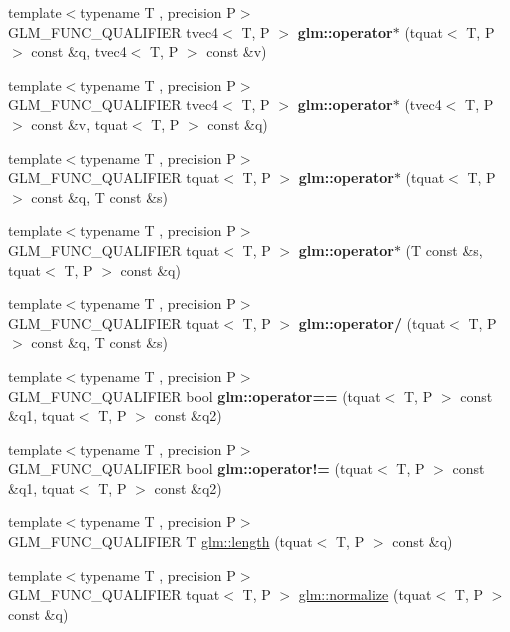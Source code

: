 \begin{DoxyCompactItemize}
\item 
{\footnotesize template$<$typename T , precision P$>$ }\\G\+L\+M\+\_\+\+F\+U\+N\+C\+\_\+\+Q\+U\+A\+L\+I\+F\+I\+ER tvec4$<$ T, P $>$ {\bfseries glm\+::operator$\ast$} (tquat$<$ T, P $>$ const \&q, tvec4$<$ T, P $>$ const \&v)
\item 
{\footnotesize template$<$typename T , precision P$>$ }\\G\+L\+M\+\_\+\+F\+U\+N\+C\+\_\+\+Q\+U\+A\+L\+I\+F\+I\+ER tvec4$<$ T, P $>$ {\bfseries glm\+::operator$\ast$} (tvec4$<$ T, P $>$ const \&v, tquat$<$ T, P $>$ const \&q)
\item 
{\footnotesize template$<$typename T , precision P$>$ }\\G\+L\+M\+\_\+\+F\+U\+N\+C\+\_\+\+Q\+U\+A\+L\+I\+F\+I\+ER tquat$<$ T, P $>$ {\bfseries glm\+::operator$\ast$} (tquat$<$ T, P $>$ const \&q, T const \&s)
\item 
{\footnotesize template$<$typename T , precision P$>$ }\\G\+L\+M\+\_\+\+F\+U\+N\+C\+\_\+\+Q\+U\+A\+L\+I\+F\+I\+ER tquat$<$ T, P $>$ {\bfseries glm\+::operator$\ast$} (T const \&s, tquat$<$ T, P $>$ const \&q)
\item 
{\footnotesize template$<$typename T , precision P$>$ }\\G\+L\+M\+\_\+\+F\+U\+N\+C\+\_\+\+Q\+U\+A\+L\+I\+F\+I\+ER tquat$<$ T, P $>$ {\bfseries glm\+::operator/} (tquat$<$ T, P $>$ const \&q, T const \&s)
\item 
{\footnotesize template$<$typename T , precision P$>$ }\\G\+L\+M\+\_\+\+F\+U\+N\+C\+\_\+\+Q\+U\+A\+L\+I\+F\+I\+ER bool {\bfseries glm\+::operator==} (tquat$<$ T, P $>$ const \&q1, tquat$<$ T, P $>$ const \&q2)
\item 
{\footnotesize template$<$typename T , precision P$>$ }\\G\+L\+M\+\_\+\+F\+U\+N\+C\+\_\+\+Q\+U\+A\+L\+I\+F\+I\+ER bool {\bfseries glm\+::operator!=} (tquat$<$ T, P $>$ const \&q1, tquat$<$ T, P $>$ const \&q2)
\item 
{\footnotesize template$<$typename T , precision P$>$ }\\G\+L\+M\+\_\+\+F\+U\+N\+C\+\_\+\+Q\+U\+A\+L\+I\+F\+I\+ER T \hyperlink{group__gtc__quaternion_gac682181783027544c8d251b4d3a60cf8}{glm\+::length} (tquat$<$ T, P $>$ const \&q)
\item 
{\footnotesize template$<$typename T , precision P$>$ }\\G\+L\+M\+\_\+\+F\+U\+N\+C\+\_\+\+Q\+U\+A\+L\+I\+F\+I\+ER tquat$<$ T, P $>$ \hyperlink{group__gtc__quaternion_ga35b6bcb22ac6d1e4a85440f5b69bdf86}{glm\+::normalize} (tquat$<$ T, P $>$ const \&q)

\end{DoxyCompactItemize}

